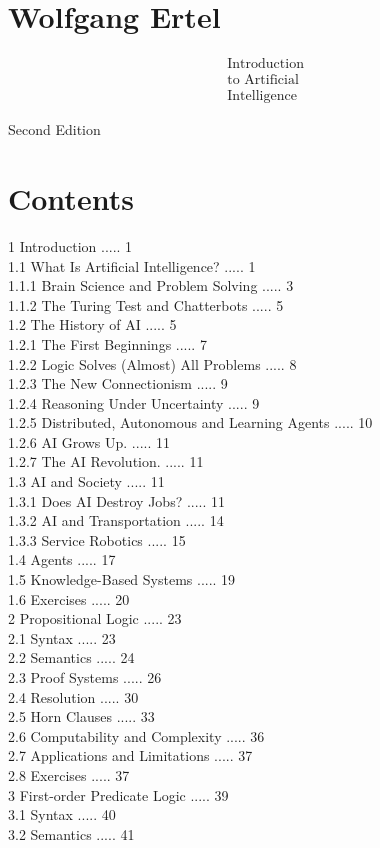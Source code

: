 \documentclass[10pt]{book}
\begin{document}
\section*{Wolfgang Ertel}
$$
\begin{aligned}
& \text { Introduction } \\
& \text { to Artificial } \\
& \text { Intelligence }
\end{aligned}
$$

Second Edition

\section*{Contents}
1 Introduction ..... 1\\
1.1 What Is Artificial Intelligence? ..... 1\\
1.1.1 Brain Science and Problem Solving ..... 3\\
1.1.2 The Turing Test and Chatterbots ..... 5\\
1.2 The History of AI ..... 5\\
1.2.1 The First Beginnings ..... 7\\
1.2.2 Logic Solves (Almost) All Problems ..... 8\\
1.2.3 The New Connectionism ..... 9\\
1.2.4 Reasoning Under Uncertainty ..... 9\\
1.2.5 Distributed, Autonomous and Learning Agents ..... 10\\
1.2.6 AI Grows Up. ..... 11\\
1.2.7 The AI Revolution. ..... 11\\
1.3 AI and Society ..... 11\\
1.3.1 Does AI Destroy Jobs? ..... 11\\
1.3.2 AI and Transportation ..... 14\\
1.3.3 Service Robotics ..... 15\\
1.4 Agents ..... 17\\
1.5 Knowledge-Based Systems ..... 19\\
1.6 Exercises ..... 20\\
2 Propositional Logic ..... 23\\
2.1 Syntax ..... 23\\
2.2 Semantics ..... 24\\
2.3 Proof Systems ..... 26\\
2.4 Resolution ..... 30\\
2.5 Horn Clauses ..... 33\\
2.6 Computability and Complexity ..... 36\\
2.7 Applications and Limitations ..... 37\\
2.8 Exercises ..... 37\\
3 First-order Predicate Logic ..... 39\\
3.1 Syntax ..... 40\\
3.2 Semantics ..... 41\\
\end{document}
